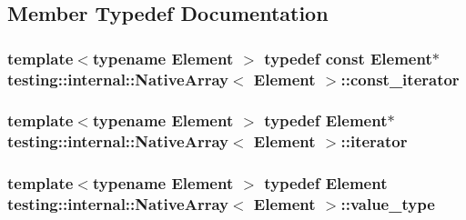 \subsection{Member Typedef Documentation}
\hypertarget{classtesting_1_1internal_1_1NativeArray_a9ce7c8408460d7158a2870456d134557}{
\subsubsection[{const\-\_\-iterator}]{\setlength{\rightskip}{0pt plus 5cm}template$<$typename Element $>$ typedef const Element$\ast$ {\bf testing\-::internal\-::\-Native\-Array}$<$ Element $>$\-::{\bf const\-\_\-iterator}}}\label{classtesting_1_1internal_1_1NativeArray_a9ce7c8408460d7158a2870456d134557}
\hypertarget{classtesting_1_1internal_1_1NativeArray_ac1301a57977b57a1ad013e4e25fc2a72}{
\subsubsection[{iterator}]{\setlength{\rightskip}{0pt plus 5cm}template$<$typename Element $>$ typedef Element$\ast$ {\bf testing\-::internal\-::\-Native\-Array}$<$ Element $>$\-::{\bf iterator}}}\label{classtesting_1_1internal_1_1NativeArray_ac1301a57977b57a1ad013e4e25fc2a72}
\hypertarget{classtesting_1_1internal_1_1NativeArray_a12216d686e16e4cc63d952fada5b2ba9}{
\subsubsection[{value\-\_\-type}]{\setlength{\rightskip}{0pt plus 5cm}template$<$typename Element $>$ typedef Element {\bf testing\-::internal\-::\-Native\-Array}$<$ Element $>$\-::{\bf value\-\_\-type}}}\label{classtesting_1_1internal_1_1NativeArray_a12216d686e16e4cc63d952fada5b2ba9}


